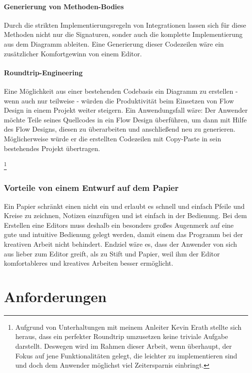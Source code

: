 \subsubsection{Generierung von Methoden-Bodies}

Durch die strikten Implementierungsregeln von Integrationen lassen sich für
diese Methoden nicht nur die Signaturen, sonder auch die komplette Implementierung aus dem Diagramm
ableiten. Eine Generierung dieser Codezeilen wäre ein zusätzlicher Komfortgewinn von einem Editor.
\subsubsection{Roundtrip-Engineering}

Eine Möglichkeit aus einer bestehenden Codebasis ein Diagramm zu erstellen -
wenn auch nur teilweise - würden die Produktivität beim Einsetzen von Flow
Design in einem Projekt weiter steigern.
Ein Anwendungsfall wäre: Der Anwender möchte
Teile seines Quellcodes in ein Flow Design überführen, um dann mit Hilfe des
Flow Designs, diesen zu überarbeiten und anschließend neu zu generieren.
Möglicherweise würde er die erstellten Codezeilen mit Copy-Paste in sein
bestehendes Projekt übertragen.


\footnote{Aufgrund von Unterhaltungen mit meinem
Anleiter Kevin Erath stellte sich heraus, dass ein perfekter Roundtrip umzusetzen keine triviale Aufgabe
darstellt. Deswegen wird im Rahmen dieser Arbeit, wenn überhaupt, der Fokus auf jene Funktionalitäten
gelegt, die leichter zu implementieren sind und doch dem Anwender möglichst viel
Zeitersparnis einbringt.}

\subsection{Vorteile von einem Entwurf auf dem Papier}

Ein Papier schränkt einen nicht ein und erlaubt es schnell und einfach Pfeile
und Kreise zu zeichnen, Notizen einzufügen und ist einfach in der Bedienung.
Bei dem Erstellen eine Editors muss deshalb ein besonders großes Augenmerk auf
eine gute und intuitive Bedienung gelegt werden, damit einem das Programm bei der kreativen Arbeit nicht
behindert. Endziel wäre es, dass der Anwender von sich aus lieber zum Editor
greift, als zu Stift und Papier, weil ihm der Editor komfortableres und
kreatives Arbeiten besser ermöglicht.

\chapter{Anforderungen}

